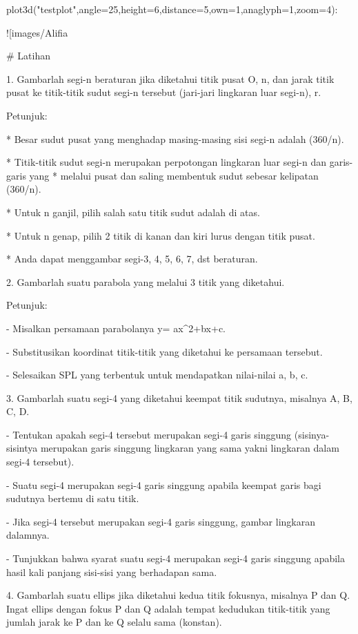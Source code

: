 \documentclass{article}
\begin{document}
\>plot3d("testplot",angle=25,height=6,distance=5,own=1,anaglyph=1,zoom=4):


![images/Alifia%

# Latihan

1. Gambarlah segi-n beraturan jika diketahui titik pusat O, n, dan jarak titik pusat ke
titik-titik sudut segi-n tersebut (jari-jari lingkaran luar segi-n), r.


Petunjuk:


* 
Besar sudut pusat yang menghadap masing-masing sisi segi-n adalah (360/n).

* 
Titik-titik sudut segi-n merupakan perpotongan lingkaran luar segi-n dan garis-garis yang
* melalui pusat dan saling membentuk sudut sebesar kelipatan (360/n).

* 
Untuk n ganjil, pilih salah satu titik sudut adalah di atas.

* 
Untuk n genap, pilih 2 titik di kanan dan kiri lurus dengan titik pusat.

* 
Anda dapat menggambar segi-3, 4, 5, 6, 7, dst beraturan.


2. Gambarlah suatu parabola yang melalui 3 titik yang diketahui.


Petunjuk:


- Misalkan persamaan parabolanya y= ax^2+bx+c.


- Substitusikan koordinat titik-titik yang diketahui ke persamaan tersebut.


- Selesaikan SPL yang terbentuk untuk mendapatkan nilai-nilai a, b, c.


3. Gambarlah suatu segi-4 yang diketahui keempat titik sudutnya, misalnya A, B, C, D.


   - Tentukan apakah segi-4 tersebut merupakan segi-4 garis singgung (sisinya-sisintya
merupakan garis singgung lingkaran yang sama yakni lingkaran dalam segi-4 tersebut).


   - Suatu segi-4 merupakan segi-4 garis singgung apabila keempat garis bagi sudutnya
bertemu di satu titik.


   - Jika segi-4 tersebut merupakan segi-4 garis singgung, gambar lingkaran dalamnya.


   - Tunjukkan bahwa syarat suatu segi-4 merupakan segi-4 garis singgung apabila hasil kali
panjang sisi-sisi yang berhadapan sama.


4. Gambarlah suatu ellips jika diketahui kedua titik fokusnya, misalnya P dan Q. Ingat
ellips dengan fokus P dan Q adalah tempat kedudukan titik-titik yang jumlah jarak ke P dan
ke Q selalu sama (konstan).
\end{document}
